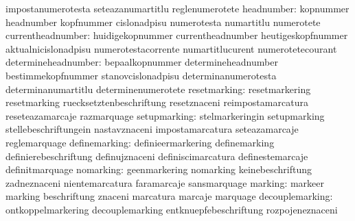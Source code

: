                                   impostanumerotesta               seteazanumartitlu
                                  reglenumerotete
                      headnumber: kopnummer                        headnumber
                                  kopfnummer                       cislonadpisu
                                  numerotesta                      numartitlu
                                  numerotete
               currentheadnumber: huidigekopnummer                 currentheadnumber
                                  heutigeskopfnummer               aktualnicislonadpisu
                                  numerotestacorrente              numartitlucurent
                                  numerotetecourant
             determineheadnumber: bepaalkopnummer                  determineheadnumber
                                  bestimmekopfnummer               stanovcislonadpisu
                                  determinanumerotesta             determinanumartitlu
                                  determinenumerotete
                    resetmarking: resetmarkering                   resetmarking
                                  ruecksetztenbeschriftung         resetznaceni
                                  reimpostamarcatura               reseteazamarcaje
                                  razmarquage
                    setupmarking: stelmarkeringin                  setupmarking
                                  stellebeschriftungein            nastavznaceni
                                  impostamarcatura                 seteazamarcaje
                                  reglemarquage
                   definemarking: definieermarkering               definemarking
                                  definierebeschriftung            definujznaceni
                                  definiscimarcatura               definestemarcaje
                                  definitmarquage
                       nomarking: geenmarkering                    nomarking
                                  keinebeschriftung                zadneznaceni
                                  nientemarcatura                  faramarcaje
                                  sansmarquage
                         marking: markeer                          marking
                                  beschriftung                     znaceni
                                  marcatura                        marcaje
                                  marquage
                 decouplemarking: ontkoppelmarkering               decouplemarking
                                  entknuepfebeschriftung           rozpojeneznaceni
